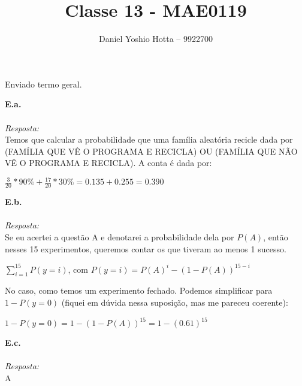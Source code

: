 \documentclass{article}
\begin{document}
	
	\title{Classe 13 - MAE0119}
	\author{Daniel Yoshio Hotta – 9922700}
	
	\maketitle	
	
		Enviado termo geral.
	
	\textbf {E.a.} 
	\\ \\
	\textit {Resposta:} \\
    
    Temos que calcular a probabilidade que uma família aleatória recicle dada por (FAMÍLIA QUE VÊ O PROGRAMA E RECICLA) OU  (FAMÍLIA QUE NÃO VÊ O PROGRAMA E RECICLA). A conta é dada por:
    
    \begin{center}
    	$\frac{3}{20} * 90\% + \frac{17}{20} * 30\% = 0.135 + 0.255 = 0.390$
    \end{center}

    
    \textbf {E.b.} 
    \\ \\
    \textit {Resposta:} \\
    
    Se eu acertei a questão A e denotarei a probabilidade dela por $P(A)$, então nesses 15 experimentos, queremos contar os que tiveram ao menos 1 sucesso.
    
    \begin{center}
    	$\sum_{i = 1}^{15} P(y = i)$, com $P(y =i) = P(A)^i - (1-P(A))^{15 - i}$
    \end{center}

    No caso, como temos um experimento fechado. Podemos simplificar para $1 - P(y = 0)$ (fiquei em dúvida nessa suposição, mas me pareceu coerente):
    
    \begin{center}
    	$1 - P(y = 0) = 1 - (1 - P(A))^{15} = 1 - (0.61)^{15}$
    \end{center}
    
    \textbf {E.c.} 
    \\ \\
    \textit {Resposta:} \\
    
    A
	
\end{document}
